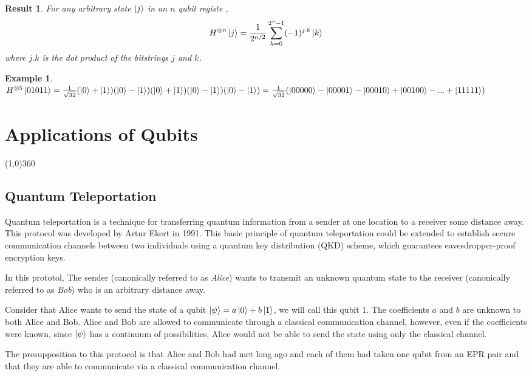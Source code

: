 \documentclass[12pt,twoside,fleqn]{report}
\theoremstyle{thmstyle}
\newtheorem{eg}{Example}[chapter]
\newtheorem{result}{Result}[chapter]
\begin{document}
\begin{result}
    For any arbitrary state $\ket{j}$ in an $n$ qubit registe , \[ H^{\otimes n} \ket{j} = \frac{1}{2^{n/2}} \sum_{k=0}^{2^n-1} (-1)^{j.k} \ket{k}\] where $j.k$ is the dot product of the bitstrings $j$ and $k$.
\end{result}

\begin{eg}
    $H^{\otimes 5} \ket{01011} = \frac{1}{\sqrt{32}} (\ket{0} + \ket{1}) (\ket{0} - \ket{1}) (\ket{0} + \ket{1}) (\ket{0} - \ket{1}) (\ket{0} - \ket{1}) = \frac{1}{\sqrt{32}} ( \ket{00000} - \ket{00001} - \ket{00010} + \ket{00100} - ... + \ket{11111} )$
\end{eg}

\chapter{Applications of Qubits}

\line(1,0){360} \\

\section{Quantum Teleportation}


Quantum teleportation is a technique for transferring quantum information from a sender at one location to a receiver some distance away. This protocol was developed by Artur Ekert in 1991. This basic principle of quantum teleportation could be extended to establish secure communication channels between two individuals using a quantum key distribution (QKD) scheme, which guarantees eavesdropper-proof encryption keys.

In this prototol, The sender (canonically referred to as \textit{Alice}) wants to transmit an unknown quantum state to the receiver (canonically referred to as \textit{Bob}) who is an arbitrary distance away. 

Consider that Alice wants to send the state of a qubit $\ket\psi = a \ket{0} + b \ket{1}$, we will call this qubit $1$. The coefficients $a$ and $b$ are unknown to both Alice and Bob. Alice and Bob are allowed to communicate through a classical communication channel, however, even if the coefficients were known, since $\ket\psi$ has a continuum of possibilities, Alice would not be able to send the state using only the classical channel.

The presupposition to this protocol is that Alice and Bob had met long ago and each of them had taken one qubit from an EPR pair and that they are able to communicate via a classical communication channel.
\end{document}
